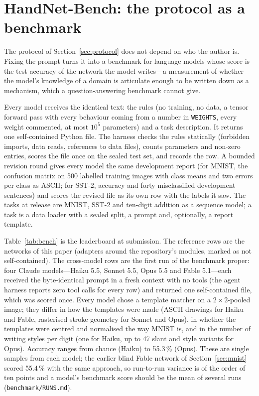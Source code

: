 \section{HandNet-Bench: the protocol as a benchmark}
\label{sec:benchmark}
The protocol of Section~\ref{sec:protocol} does not depend on who the author is.
Fixing the prompt turns it into a benchmark for language models whose score is the
test accuracy of the network the model writes---a measurement of whether the model's
knowledge of a domain is articulate enough to be written down as a mechanism, which
a question-answering benchmark cannot give.

Every model receives the identical text: the rules (no training, no data, a tensor
forward pass with every behaviour coming from a number in \texttt{WEIGHTS}, every
weight commented, at most $10^5$ parameters) and a task description. It returns one
self-contained Python file. The harness checks the rules statically (forbidden
imports, data reads, references to data files), counts parameters and non-zero
entries, scores the file once on the sealed test set, and records the row. A
bounded revision round gives every model the same development report (for MNIST,
the confusion matrix on 500 labelled training images with class means and two
errors per class as ASCII; for SST-2, accuracy and forty misclassified development
sentences) and scores the revised file as its own row with the labels it saw. The
tasks at release are MNIST, SST-2 and ten-digit addition as a sequence model; a
task is a data loader with a sealed split, a prompt and, optionally, a report
template.

Table~\ref{tab:bench} is the leaderboard at submission. The reference rows are the
networks of this paper (adapters around the repository's modules, marked as not
self-contained). The cross-model rows are the first run of the benchmark proper:
four Claude models---Haiku 5.5, Sonnet 5.5, Opus 5.5 and Fable 5.1---each received
the byte-identical prompt in a fresh context with no tools (the agent harness
reports zero tool calls for every row) and returned one self-contained file,
which was scored once. Every model chose a template matcher on a $2\times2$-pooled
image; they differ in how the templates were made (ASCII drawings for Haiku and
Fable, rasterised stroke geometry for Sonnet and Opus), in whether the templates
were centred and normalised the way MNIST is, and in the number of writing
styles per digit (one for Haiku, up to 47 slant and style variants for Opus).
Accuracy ranges from chance (Haiku) to 55.3\,\% (Opus). These are single samples
from each model; the earlier blind Fable network of Section~\ref{sec:mnist}
scored 55.4\,\% with the same approach, so run-to-run variance is of the order of
ten points and a model's benchmark score should be the mean of several runs
(\texttt{benchmark/RUNS.md}).

